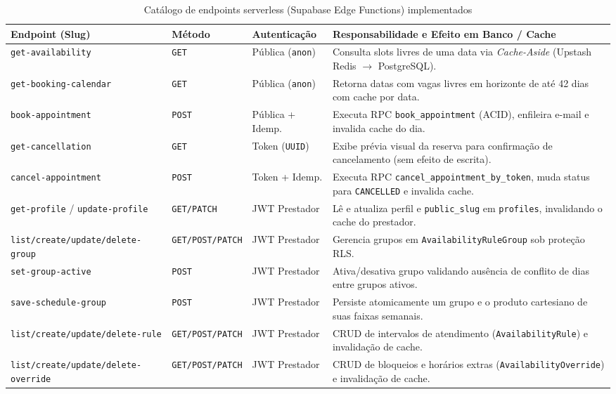 \documentclass[12pt,a4paper]{article}
\begin{document}
\begin{table}[hbt]
\centering
\caption{Catálogo de endpoints serverless (Supabase Edge Functions) implementados}
\label{quadro:catalogo_endpoints}
\scriptsize
\renewcommand{\arraystretch}{1.15}
\begin{tabularx}{\textwidth}{|l|l|l|X|}
\hline
\textbf{Endpoint (Slug)} & \textbf{Método} & \textbf{Autenticação} & \textbf{Responsabilidade e Efeito em Banco / Cache} \\ \hline
\texttt{get-availability} & \texttt{GET} & Pública (\texttt{anon}) & Consulta slots livres de uma data via \textit{Cache-Aside} (Upstash Redis $\rightarrow$ PostgreSQL). \\ \hline
\texttt{get-booking-calendar} & \texttt{GET} & Pública (\texttt{anon}) & Retorna datas com vagas livres em horizonte de até 42 dias com cache por data. \\ \hline
\texttt{book-appointment} & \texttt{POST} & Pública + Idemp. & Executa RPC \texttt{book\_appointment} (ACID), enfileira e-mail e invalida cache do dia. \\ \hline
\texttt{get-cancellation} & \texttt{GET} & Token (\texttt{UUID}) & Exibe prévia visual da reserva para confirmação de cancelamento (sem efeito de escrita). \\ \hline
\texttt{cancel-appointment} & \texttt{POST} & Token + Idemp. & Executa RPC \texttt{cancel\_appointment\_by\_token}, muda status para \texttt{CANCELLED} e invalida cache. \\ \hline
\texttt{get-profile} / \texttt{update-profile} & \texttt{GET/PATCH} & JWT Prestador & Lê e atualiza perfil e \texttt{public\_slug} em \texttt{profiles}, invalidando o cache do prestador. \\ \hline
\texttt{list/create/update/delete-group} & \texttt{GET/POST/PATCH} & JWT Prestador & Gerencia grupos em \texttt{AvailabilityRuleGroup} sob proteção RLS. \\ \hline
\texttt{set-group-active} & \texttt{POST} & JWT Prestador & Ativa/desativa grupo validando ausência de conflito de dias entre grupos ativos. \\ \hline
\texttt{save-schedule-group} & \texttt{POST} & JWT Prestador & Persiste atomicamente um grupo e o produto cartesiano de suas faixas semanais. \\ \hline
\texttt{list/create/update/delete-rule} & \texttt{GET/POST/PATCH} & JWT Prestador & CRUD de intervalos de atendimento (\texttt{AvailabilityRule}) e invalidação de cache. \\ \hline
\texttt{list/create/update/delete-override} & \texttt{GET/POST/PATCH} & JWT Prestador & CRUD de bloqueios e horários extras (\texttt{AvailabilityOverride}) e invalidação de cache. \\ \hline

\end{tabularx}
\end{table}
\end{document}
